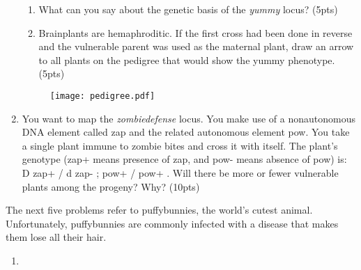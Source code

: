 \documentclass[]{article}
\begin{document}
\begin{enumerate}
\begin{enumerate}
\item What can you say about the genetic basis of the \emph{yummy} locus? (5pts)


\item Brainplants are hemaphroditic. If the first cross had been done in reverse and the vulnerable parent was used as the maternal plant, draw an arrow to all plants on the pedigree that would show the yummy phenotype. (5pts)


\end{enumerate}

\begin{figure}[here]
\texttt{[image: pedigree.pdf]}
\caption{}
\label{fig:ped}
\end{figure}

\item You want to map the \emph{zombiedefense} locus. You make use of a nonautonomous DNA element called zap and the related autonomous element pow. You take a single plant immune to zombie bites and cross it with itself. The plant's genotype (zap+ means presence of zap, and pow- means absence of pow) is:  D zap+ / d zap- ; pow+ / pow+  .  Will there be more or fewer vulnerable plants among the progeny?  Why? (10pts)




 

\end{enumerate}

The next five problems refer to puffybunnies, the world's cutest animal. Unfortunately, puffybunnies are commonly infected with a disease that makes them lose all their hair. 

\begin{enumerate}

\item 

\end{enumerate}
\end{document}

